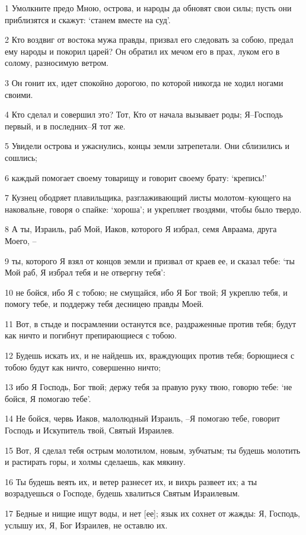 \par 1 Умолкните предо Мною, острова, и народы да обновят свои силы; пусть они приблизятся и скажут: `станем вместе на суд'.
\par 2 Кто воздвиг от востока мужа правды, призвал его следовать за собою, предал ему народы и покорил царей? Он обратил их мечом его в прах, луком его в солому, разносимую ветром.
\par 3 Он гонит их, идет спокойно дорогою, по которой никогда не ходил ногами своими.
\par 4 Кто сделал и совершил это? Тот, Кто от начала вызывает роды; Я--Господь первый, и в последних--Я тот же.
\par 5 Увидели острова и ужаснулись, концы земли затрепетали. Они сблизились и сошлись;
\par 6 каждый помогает своему товарищу и говорит своему брату: `крепись!'
\par 7 Кузнец ободряет плавильщика, разглаживающий листы молотом--кующего на наковальне, говоря о спайке: `хороша'; и укрепляет гвоздями, чтобы было твердо.
\par 8 А ты, Израиль, раб Мой, Иаков, которого Я избрал, семя Авраама, друга Моего, --
\par 9 ты, которого Я взял от концов земли и призвал от краев ее, и сказал тебе: `ты Мой раб, Я избрал тебя и не отвергну тебя':
\par 10 не бойся, ибо Я с тобою; не смущайся, ибо Я Бог твой; Я укреплю тебя, и помогу тебе, и поддержу тебя десницею правды Моей.
\par 11 Вот, в стыде и посрамлении останутся все, раздраженные против тебя; будут как ничто и погибнут препирающиеся с тобою.
\par 12 Будешь искать их, и не найдешь их, враждующих против тебя; борющиеся с тобою будут как ничто, совершенно ничто;
\par 13 ибо Я Господь, Бог твой; держу тебя за правую руку твою, говорю тебе: `не бойся, Я помогаю тебе'.
\par 14 Не бойся, червь Иаков, малолюдный Израиль, --Я помогаю тебе, говорит Господь и Искупитель твой, Святый Израилев.
\par 15 Вот, Я сделал тебя острым молотилом, новым, зубчатым; ты будешь молотить и растирать горы, и холмы сделаешь, как мякину.
\par 16 Ты будешь веять их, и ветер разнесет их, и вихрь развеет их; а ты возрадуешься о Господе, будешь хвалиться Святым Израилевым.
\par 17 Бедные и нищие ищут воды, и нет [ее]; язык их сохнет от жажды: Я, Господь, услышу их, Я, Бог Израилев, не оставлю их.
